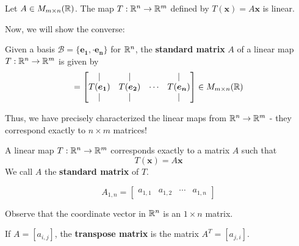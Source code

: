 \begin{theorem}
    Let $A \in M_{m \times n}(\mathbb{R})$.  The map $T : \mathbb{R}^n \to \mathbb{R}^m$ defined by $T(\bm{x}) = A\bm{x}$ is linear.
    \end{theorem}

Now, we will show the converse:

\begin{definition}
    Given a basis $\mathcal{B} = \{\bm{e_1}, \cdot \bm{e_n}\}$ for $\mathbb{R}^n$, the \textbf{standard matrix} $A$ of a linear map $T: \mathbb{R}^n \to \mathbb{R}^m$ is given by
    \begin{equation*}
[A] = 
\begin{bmatrix}
\vert & \vert & & \vert \\
    T(\bm{e_1})   & T(\bm{e_2}) & \cdots & T(\bm{e_n})  \\
    \vert & \vert & & \vert
\end{bmatrix} \in M_{m \times n}(\R)
\end{equation*}
\end{definition}

    Thus, we have precisely characterized the linear maps from $\mathbb{R}^n \to \mathbb{R}^m$ - they correspond exactly to $n \times m$ matrices!
    
    \begin{theorem}
    A linear map $T: \mathbb{R}^n \to \mathbb{R}^m$ corresponds exactly to a matrix $A$ such that $$T(\bm{x}) = A\bm{x}$$  
    We call $A$ the \textbf{standard matrix} of $T$.
    \end{theorem}



\begin{example}\label{coordinatematrix}
    \begin{equation*}
A_{1,n} = 
\begin{bmatrix}
a_{1,1} & a_{1,2} & \cdots & a_{1,n} 
\end{bmatrix}
\end{equation*}

Observe that the coordinate vector in $\mathbb{R}^n$ is an $1 \times n$ matrix.
    \end{example}


\begin{definition}\label{transpose}
If $A = [a_{i,j}]$, the \textbf{transpose matrix} is the matrix $A^T = [a_{j,i}]$.
\end{definition}








